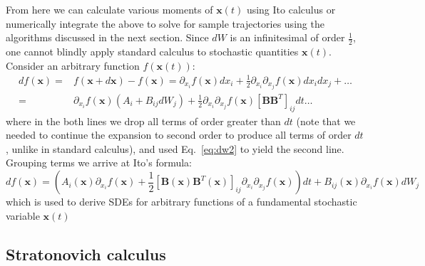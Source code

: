\documentclass[onecolumn,notitlepage,pra,10pt,aps]{revtex4-1}
\newcommand {\be}{\begin{equation}}
\newcommand {\ee}{\end{equation}}
\begin{document}
From here we can calculate various moments of $\mathbf{x}(t)$ using Ito calculus or numerically integrate the above to solve for sample trajectories using the algorithms discussed in the next section.  Since $dW$ is an infinitesimal of order $\frac{1}{2}$, one cannot blindly apply standard calculus to stochastic quantities $\mathbf{x}(t)$.  Consider an arbitrary function $f(\mathbf{x}(t))$:
\begin{align}
df(\mathbf{x})=&f(\mathbf{x}+d\mathbf{x})-f(\mathbf{x})=\partial_{x_i}f(\mathbf{x})dx_i +\frac{1}{2}\partial_{x_i}\partial_{x_j}f(\mathbf{x})dx_idx_j+\dots \nonumber \\
=&\partial_{x_i}f(\mathbf{x})\left(A_i+B_{ij}dW_j\right)+\frac{1}{2}\partial_{x_i}\partial_{x_j}f(\mathbf{x})\left[\mathbf{B}\mathbf{B}^T\right]_{ij}dt   \dots \label{eq:itocalc}
\end{align}
where in the both lines we drop all terms of order greater than $dt$ (note that we needed to continue the expansion to second order to produce all terms of order $dt$, unlike in standard calculus), and used Eq.~\eqref{eq:dw2} to yield the second line. Grouping terms we arrive at Ito's formula:
\be
df(\mathbf{x})=\left(A_i(\mathbf{x})\partial_{x_i}f(\mathbf{x})+ \frac{1}{2} \left[\mathbf{B}(\mathbf{x})\mathbf{B}^T(\mathbf{x})\right]_{ij}\partial_{x_i}\partial_{x_j}f(\mathbf{x})\right)dt  
+B_{ij}(\mathbf{x})\partial_{x_i}f(\mathbf{x})dW_j \label{eq:itos}
\ee
 which is used to derive SDEs for arbitrary functions of a fundamental stochastic variable $\mathbf{x}(t)$ 

\subsection{Stratonovich calculus}
\end{document}
